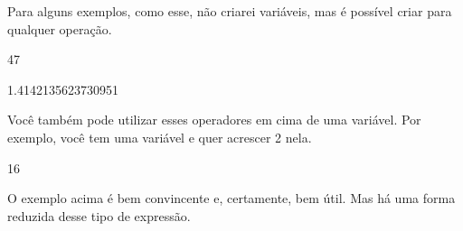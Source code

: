 \documentclass[letterpaper,10pt,english]{jupyterBook}
\begin{document}
\sphinxAtStartPar
Para alguns exemplos, como esse, não criarei variáveis, mas é possível criar para qualquer operação.

\begin{sphinxVerbatim}[commandchars=\\\{\}]
       
\end{sphinxVerbatim}

\begin{sphinxVerbatim}[commandchars=\\\{\}]
47
\end{sphinxVerbatim}

\begin{sphinxVerbatim}[commandchars=\\\{\}]
   
\end{sphinxVerbatim}

\begin{sphinxVerbatim}[commandchars=\\\{\}]
1.4142135623730951
\end{sphinxVerbatim}

\sphinxAtStartPar
Você também pode utilizar esses operadores em cima de uma variável. Por exemplo, você tem uma variável e quer acrescer 2 nela.

\begin{sphinxVerbatim}[commandchars=\\\{\}]
  
    
\end{sphinxVerbatim}

\begin{sphinxVerbatim}[commandchars=\\\{\}]
16
\end{sphinxVerbatim}

\sphinxAtStartPar
O exemplo acima é bem convincente e, certamente, bem útil. Mas há uma forma reduzida desse tipo de expressão.

\begin{sphinxVerbatim}[commandchars=\\\{\}]
  
  
\end{sphinxVerbatim}
\end{document}
